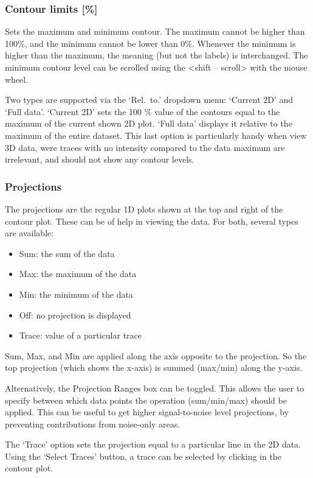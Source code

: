 \documentclass[11pt,a4paper]{article}
\begin{document}
\subsubsection*{Contour limits [\%]}
Sets the maximum and minimum contour. The maximum cannot be higher than 100\%, and the minimum
cannot be lower than 0\%. Whenever the minimum is higher than the maximum, the meaning (but not the
labels) is interchanged. The minimum contour level can be scrolled using the <shift -- scroll> with
the mouse wheel.

Two types are supported via the `Rel.\ to.' dropdown menu: `Current 2D' and `Full data'. `Current
2D' sets the 100 \% value of the contours equal to the maximum of the current shown 2D plot. `Full
data' displays it relative to the maximum of the entire dataset. This last option is particularly
handy when view 3D data, were traces with no intensity compared to the data maximum are irrelevant,
and should not show any contour levels.

\subsubsection*{Projections}
The projections are the regular 1D plots shown at the top and right of the contour plot. These can be of help in viewing the data.
For both, several types are available:
\begin{itemize}
  \item Sum: the sum of the data
  \item Max: the maximum of the data
  \item Min: the minimum of the data
  \item Off: no projection is displayed
  \item Trace: value of a particular trace
\end{itemize}
Sum, Max, and Min are applied along the axis opposite to the projection. So the top projection
(which shows the x-axis) is summed (max/min) along the y-axis.

Alternatively, the Projection Ranges box can be toggled. This allows the user to specify between
which data points the operation (sum/min/max) should be applied.  This can be useful to get higher
signal-to-noise level projections, by preventing contributions from noise-only areas.

The `Trace' option sets the projection equal to a particular line in the 2D data. Using the `Select
Traces' button, a trace can be selected by clicking in the contour plot.
\end{document}
